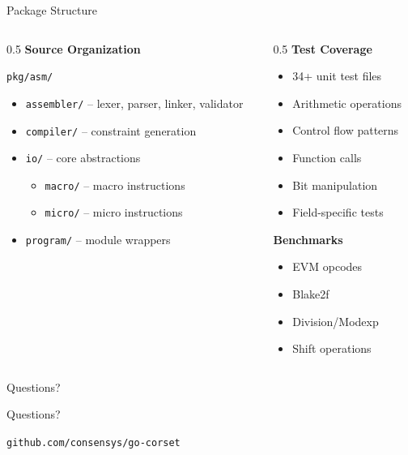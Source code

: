 \documentclass[aspectratio=169,11pt]{beamer}
\begin{document}
\begin{frame}{Package Structure}

\begin{columns}
\begin{column}{0.5\textwidth}
\textbf{Source Organization}

\texttt{pkg/asm/}
\begin{itemize}
    \item \texttt{assembler/} -- lexer, parser, linker, validator
    \item \texttt{compiler/} -- constraint generation
    \item \texttt{io/} -- core abstractions
    \begin{itemize}
        \item \texttt{macro/} -- macro instructions
        \item \texttt{micro/} -- micro instructions
    \end{itemize}
    \item \texttt{program/} -- module wrappers
\end{itemize}
\end{column}

\begin{column}{0.5\textwidth}
\textbf{Test Coverage}
\begin{itemize}
    \item 34+ unit test files
    \item Arithmetic operations
    \item Control flow patterns
    \item Function calls
    \item Bit manipulation
    \item Field-specific tests
\end{itemize}

\vspace{0.5em}
\textbf{Benchmarks}
\begin{itemize}
    \item EVM opcodes
    \item Blake2f
    \item Division/Modexp
    \item Shift operations
\end{itemize}
\end{column}
\end{columns}
\end{frame}

\begin{frame}{Questions?}
\begin{center}
\vspace{2em}
{\Huge Questions?}

\vspace{3em}
{\large \texttt{github.com/consensys/go-corset}}
\end{center}
\end{frame}
\end{document}
